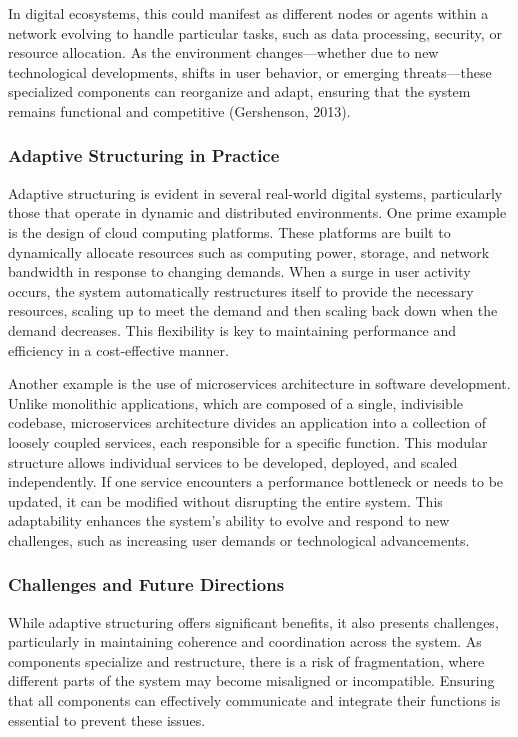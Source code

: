 \documentclass[12pt,twoside]{article}
\begin{document}
In digital ecosystems, this could manifest as different nodes or agents within a network evolving to handle particular tasks, such as data processing, security, or resource allocation. As the environment changes—whether due to new technological developments, shifts in user behavior, or emerging threats—these specialized components can reorganize and adapt, ensuring that the system remains functional and competitive (Gershenson, 2013).

\subsubsection{Adaptive Structuring in Practice}

Adaptive structuring is evident in several real-world digital systems, particularly those that operate in dynamic and distributed environments. One prime example is the design of cloud computing platforms. These platforms are built to dynamically allocate resources such as computing power, storage, and network bandwidth in response to changing demands. When a surge in user activity occurs, the system automatically restructures itself to provide the necessary resources, scaling up to meet the demand and then scaling back down when the demand decreases. This flexibility is key to maintaining performance and efficiency in a cost-effective manner.

Another example is the use of microservices architecture in software development. Unlike monolithic applications, which are composed of a single, indivisible codebase, microservices architecture divides an application into a collection of loosely coupled services, each responsible for a specific function. This modular structure allows individual services to be developed, deployed, and scaled independently. If one service encounters a performance bottleneck or needs to be updated, it can be modified without disrupting the entire system. This adaptability enhances the system’s ability to evolve and respond to new challenges, such as increasing user demands or technological advancements.

\subsubsection{Challenges and Future Directions}

While adaptive structuring offers significant benefits, it also presents challenges, particularly in maintaining coherence and coordination across the system. As components specialize and restructure, there is a risk of fragmentation, where different parts of the system may become misaligned or incompatible. Ensuring that all components can effectively communicate and integrate their functions is essential to prevent these issues.
\end{document}
